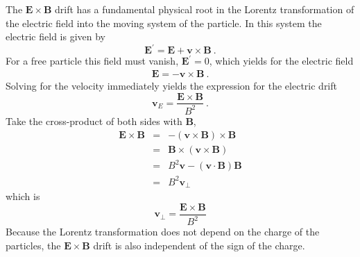 \documentclass[12pt,a4paper]{article}
\renewcommand{\vec}[1]{\boldsymbol{#1}}
\begin{document}
\cite{1996bspp.book.....B} The $\vec{E} \times \vec{B}$ drift has a fundamental physical root in the Lorentz transformation of the electric field into the moving system of the particle. In this system the electric field is given by
\begin{equation}
\vec{E}^\prime = \vec{E} + \vec{v} \times \vec{B} ~.
\end{equation}
For a free particle this field must vanish, $\vec{E}^\prime = 0$, which yields for the electric field
\begin{eqnarray}
\vec{E} = -\vec{v} \times \vec{B} ~.
\end{eqnarray}
Solving for the velocity immediately yields the expression for the electric drift
\begin{equation}
\vec{v}_E = \dfrac{\vec{E} \times \vec{B}}{B^2} ~.
\end{equation}
Take the cross-product of both sides with $\vec{B}$, 
\begin{eqnarray*}
\vec{E} \times \vec{B} &=&  -(\vec{v} \times \vec{B}) \times \vec{B} \\
&=& \vec{B}\times (\vec{v} \times \vec{B}) \\
&=& B^2 \vec{v} -(\vec{v} \cdot \vec{B})\vec{B} \\
&=& B^2 \vec{v}_\perp
\end{eqnarray*}
which is
\begin{equation}
\vec{v}_\perp = \frac{\vec{E} \times \vec{B}}{B^2} 
\end{equation}
Because the Lorentz transformation does not depend on the charge of the particles, the $\vec{E}\times \vec{B}$ drift is also independent of the sign of the charge.
\end{document}
